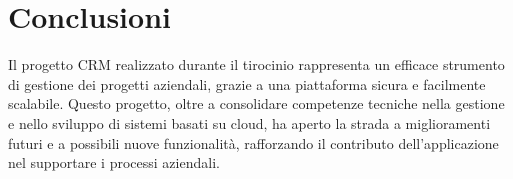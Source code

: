 \documentclass[target=bach,aauheader=,style=]{thud}
\begin{document}
\begin{itemize}
\end{itemize}

\section{Conclusioni}
Il progetto CRM realizzato durante il tirocinio rappresenta un efficace strumento di gestione dei progetti aziendali, grazie a una piattaforma sicura e facilmente scalabile. Questo progetto, oltre a consolidare competenze tecniche nella gestione e nello sviluppo di sistemi basati su cloud, ha aperto la strada a miglioramenti futuri e a possibili nuove funzionalità, rafforzando il contributo dell'applicazione nel supportare i processi aziendali.









\end{document}
